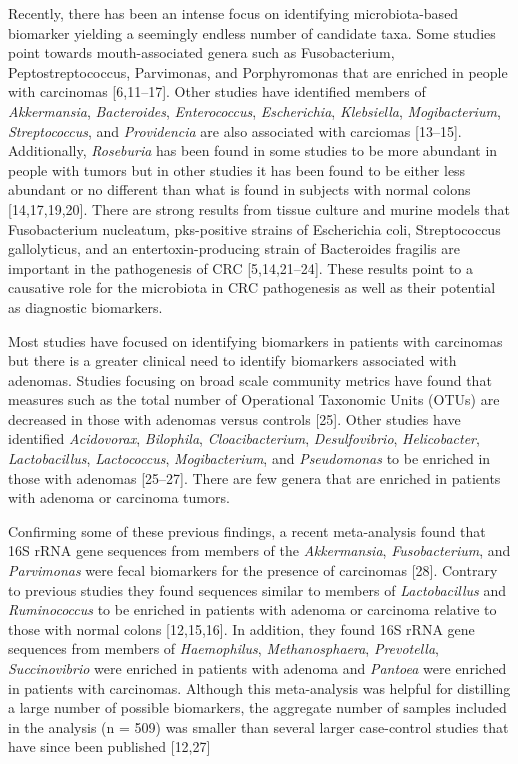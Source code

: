 \documentclass[12pt,]{article}
\begin{document}
Recently, there has been an intense focus on identifying
microbiota-based biomarker yielding a seemingly endless number of
candidate taxa. Some studies point towards mouth-associated genera such
as Fusobacterium, Peptostreptococcus, Parvimonas, and Porphyromonas that
are enriched in people with carcinomas {[}6,11--17{]}. Other studies
have identified members of \emph{Akkermansia}, \emph{Bacteroides},
\emph{Enterococcus}, \emph{Escherichia}, \emph{Klebsiella},
\emph{Mogibacterium}, \emph{Streptococcus}, and \emph{Providencia} are
also associated with carciomas {[}13--15{]}. Additionally,
\emph{Roseburia} has been found in some studies to be more abundant in
people with tumors but in other studies it has been found to be either
less abundant or no different than what is found in subjects with normal
colons {[}14,17,19,20{]}. There are strong results from tissue culture
and murine models that Fusobacterium nucleatum, pks-positive strains of
Escherichia coli, Streptococcus gallolyticus, and an
entertoxin-producing strain of Bacteroides fragilis are important in the
pathogenesis of CRC {[}5,14,21--24{]}. These results point to a
causative role for the microbiota in CRC pathogenesis as well as their
potential as diagnostic biomarkers.

Most studies have focused on identifying biomarkers in patients with
carcinomas but there is a greater clinical need to identify biomarkers
associated with adenomas. Studies focusing on broad scale community
metrics have found that measures such as the total number of Operational
Taxonomic Units (OTUs) are decreased in those with adenomas versus
controls {[}25{]}. Other studies have identified \emph{Acidovorax},
\emph{Bilophila}, \emph{Cloacibacterium}, \emph{Desulfovibrio},
\emph{Helicobacter}, \emph{Lactobacillus}, \emph{Lactococcus},
\emph{Mogibacterium}, and \emph{Pseudomonas} to be enriched in those
with adenomas {[}25--27{]}. There are few genera that are enriched in
patients with adenoma or carcinoma tumors.

Confirming some of these previous findings, a recent meta-analysis found
that 16S rRNA gene sequences from members of the \emph{Akkermansia},
\emph{Fusobacterium}, and \emph{Parvimonas} were fecal biomarkers for
the presence of carcinomas {[}28{]}. Contrary to previous studies they
found sequences similar to members of \emph{Lactobacillus} and
\emph{Ruminococcus} to be enriched in patients with adenoma or carcinoma
relative to those with normal colons {[}12,15,16{]}. In addition, they
found 16S rRNA gene sequences from members of \emph{Haemophilus},
\emph{Methanosphaera}, \emph{Prevotella}, \emph{Succinovibrio} were
enriched in patients with adenoma and \emph{Pantoea} were enriched in
patients with carcinomas. Although this meta-analysis was helpful for
distilling a large number of possible biomarkers, the aggregate number
of samples included in the analysis (n = 509) was smaller than several
larger case-control studies that have since been published {[}12,27{]}
\end{document}

